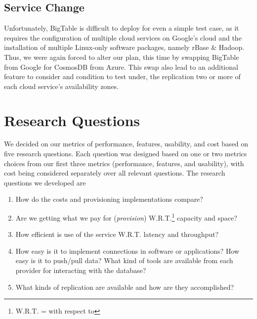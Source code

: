 
\subsection{Service Change}

Unfortunately, BigTable is difficult to deploy for even a simple test case, as it requires the configuration of multiple cloud services on Google's cloud and the installation of multiple Linux-only software packages, namely rBase \& Hadoop.  Thus, we were again forced to alter our plan, this time by swapping BigTable from Google for CosmosDB from Azure.  This swap also lead to an additional feature to consider and condition to test under, the replication two or more of each cloud service's availability zones.






\section{Research Questions}

We decided on our metrics of performance, features, usability, and cost based on five research questions.  Each question was designed based on one or two metrics choices from our first three metrics (performance, features, and usability), with cost being considered separately over all relevant questions.  The research questions we developed are 

\vspace{0.1in}
\begin{spacing}{1.2}
\begin{enumerate}[label=\Large{\textbf{\arabic*}):}]
	\item How do the costs and provisioning implementations compare?
	\vspace{0.05in}
	\item Are we getting what we pay for (\emph{provision}) W.R.T.\footnote{W.R.T. = with respect to} capacity and space?
	\vspace{0.05in}
	\item How efficient is use of the service W.R.T. latency and throughput?
	\vspace{0.05in}
	\item How easy is it to implement connections in software or applications? How easy is it to push/pull data?  What kind of tools are available from each provider for interacting with the database?
	\vspace{0.05in}
	\item What kinds of replication are available and how are they accomplished?
\end{enumerate}
\end{spacing}


